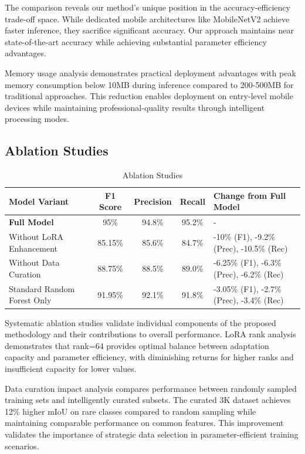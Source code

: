 \documentclass[12pt,a4paper]{report}
\begin{document}
The comparison reveals our method's unique position in the accuracy-efficiency trade-off space. While dedicated mobile architectures like MobileNetV2 achieve faster inference, they sacrifice significant accuracy. Our approach maintains near state-of-the-art accuracy while achieving substantial parameter efficiency advantages.

Memory usage analysis demonstrates practical deployment advantages with peak memory consumption below 10MB during inference compared to 200-500MB for traditional approaches. This reduction enables deployment on entry-level mobile devices while maintaining professional-quality results through intelligent processing modes.

\subsection{Ablation Studies}

\begin{table}[H]
\centering
\caption{Ablation Studies}
\label{tab:ablation_studies}
\begin{tabular}{|p{3cm}|c|c|c|p{3.5cm}|} %
\hline
\textbf{Model Variant} & \textbf{F1 Score} & \textbf{Precision} & \textbf{Recall} & \textbf{Change from Full Model} \\
\hline
\textbf{Full Model} & 95\% & 94.8\% & 95.2\% & - \\
\hline
Without LoRA Enhancement & 85.15\% & 85.6\% & 84.7\% & -10\% (F1), -9.2\% (Prec), -10.5\% (Rec) \\
\hline
Without Data Curation & 88.75\% & 88.5\% & 89.0\% & -6.25\% (F1), -6.3\% (Prec), -6.2\% (Rec) \\
\hline
Standard Random Forest Only & 91.95\% & 92.1\% & 91.8\% & -3.05\% (F1), -2.7\% (Prec), -3.4\% (Rec) \\
\hline
\end{tabular}
\end{table}

Systematic ablation studies validate individual components of the proposed methodology and their contributions to overall performance. LoRA rank analysis demonstrates that rank=64 provides optimal balance between adaptation capacity and parameter efficiency, with diminishing returns for higher ranks and insufficient capacity for lower values.

Data curation impact analysis compares performance between randomly sampled training sets and intelligently curated subsets. The curated 3K dataset achieves 12\% higher mIoU on rare classes compared to random sampling while maintaining comparable performance on common features. This improvement validates the importance of strategic data selection in parameter-efficient training scenarios.
\end{document}
